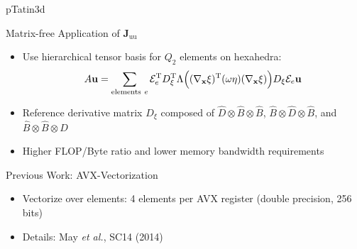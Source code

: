 \begin{frame}{pTatin3d}

  \begin{block}{Matrix-free Application of $\mathbf{J}_\mathrm{uu}$}
  \begin{itemize}
   \item Use hierarchical tensor basis for $Q_2$ elements on hexahedra:
    \begin{align*}
     A\mathbf{u} = \sum_{\mathrm{elements}\ e} \mathcal{E}_e^{\mathrm T} D_\xi^{\mathrm T} \Lambda\Bigl( (\nabla_{\mathbf x} \xi)^{\mathrm T} (\omega \eta) (\nabla_{\mathbf x} \xi) \Bigr) D_\xi \mathcal{E}_e  \mathbf{u}
    \end{align*}
   \item Reference derivative matrix $D_\xi$ composed of $\hat{D} \otimes \hat{B} \otimes \hat{B}$, $\hat{B} \otimes \hat{D} \otimes \hat{B}$, and $\hat{B} \otimes \hat{B} \otimes \hat{D}$
   \item Higher FLOP/Byte ratio and lower memory bandwidth requirements
  \end{itemize}
  \end{block}

  \begin{block}{Previous Work: AVX-Vectorization}
   \begin{itemize}
    \item Vectorize over elements: 4 elements per AVX register (double precision, 256 bits)
    \item Details: May \textit{et al.}, SC14 (2014)
   \end{itemize}

  \end{block}
  
\end{frame}





